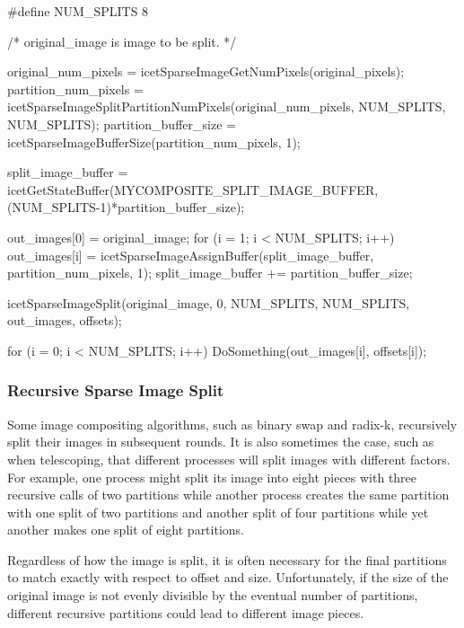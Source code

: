 \begin{code}
#define NUM_SPLITS 8

/* original_image is image to be split. */

original_num_pixels = icetSparseImageGetNumPixels(original_pixels);
partition_num_pixels
    = icetSparseImageSplitPartitionNumPixels(original_num_pixels,
                                             NUM_SPLITS,
                                             NUM_SPLITS);
partition_buffer_size = icetSparseImageBufferSize(partition_num_pixels, 1);

split_image_buffer = icetGetStateBuffer(MYCOMPOSITE_SPLIT_IMAGE_BUFFER,
                                        (NUM_SPLITS-1)*partition_buffer_size);

out_images[0] = original_image;
for (i = 1; i < NUM_SPLITS; i++) {
    out_images[i] = icetSparseImageAssignBuffer(split_image_buffer,
                                                partition_num_pixels, 1);
    split_image_buffer += partition_buffer_size;
}

icetSparseImageSplit(original_image,
                     0,
                     NUM_SPLITS,
                     NUM_SPLITS,
                     out_images,
                     offsets);

for (i = 0; i < NUM_SPLITS; i++) {
    DoSomething(out_images[i], offsets[i]);
}
\end{code}

\subsubsection{Recursive Sparse Image Split}

Some image compositing algorithms, such as binary swap and radix-k,
recursively split their images in subsequent rounds.  It is also sometimes
the case, such as when telescoping, that different processes will split
images with different factors.  For example, one process might split its
image into eight pieces with three recursive calls of two partitions while
another process creates the same partition with one split of two partitions
and another split of four partitions while yet another makes one split of
eight partitions.

Regardless of how the image is split, it is often necessary for the final
partitions to match exactly with respect to offset and size.
Unfortunately, if the size of the original image is not evenly divisible by
the eventual number of partitions, different recursive partitions could
lead to different image pieces.

